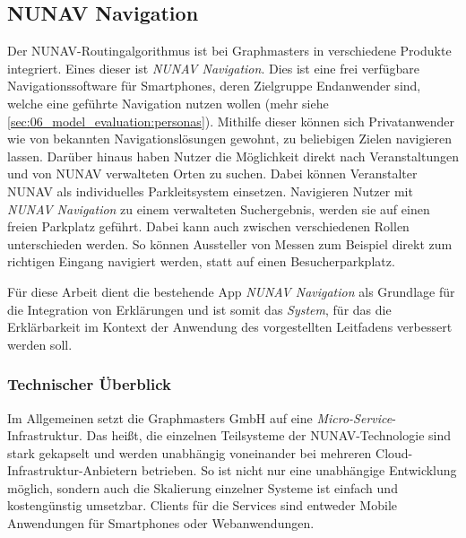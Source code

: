 \subsection{NUNAV Navigation}

Der NUNAV-Routingalgorithmus ist bei Graphmasters in verschiedene Produkte integriert. Eines dieser ist \textit{NUNAV Navigation}. Dies ist eine frei verfügbare Navigationssoftware für Smartphones, deren Zielgruppe Endanwender sind, welche eine geführte Navigation nutzen wollen (mehr siehe \autoref{sec:06_model_evaluation:personas}). Mithilfe dieser können sich Privatanwender wie von bekannten Navigationslösungen gewohnt, zu beliebigen Zielen navigieren lassen. Darüber hinaus haben Nutzer die Möglichkeit direkt nach Veranstaltungen und von NUNAV verwalteten Orten zu suchen. Dabei können Veranstalter NUNAV als individuelles Parkleitsystem einsetzen. Navigieren Nutzer mit \textit{NUNAV Navigation} zu einem verwalteten Suchergebnis, werden sie auf einen freien Parkplatz geführt. Dabei kann auch zwischen verschiedenen Rollen unterschieden werden. So können Aussteller von Messen zum Beispiel direkt zum richtigen Eingang navigiert werden, statt auf einen Besucherparkplatz.

Für diese Arbeit dient die bestehende App \textit{NUNAV Navigation} als Grundlage für die Integration von Erklärungen und ist somit das \textit{System}, für das die Erklärbarkeit im Kontext der Anwendung des vorgestellten Leitfadens verbessert werden soll.

\subsubsection{Technischer Überblick}

Im Allgemeinen setzt die Graphmasters GmbH auf eine \textit{Micro-Service}-Infrastruktur. Das heißt, die einzelnen Teilsysteme der NUNAV-Technologie sind stark gekapselt und werden unabhängig voneinander bei mehreren Cloud-Infrastruktur-Anbietern betrieben. So ist nicht nur eine unabhängige Entwicklung möglich, sondern auch die Skalierung einzelner Systeme ist einfach und kostengünstig umsetzbar. Clients für die Services sind entweder Mobile Anwendungen für Smartphones oder Webanwendungen.

